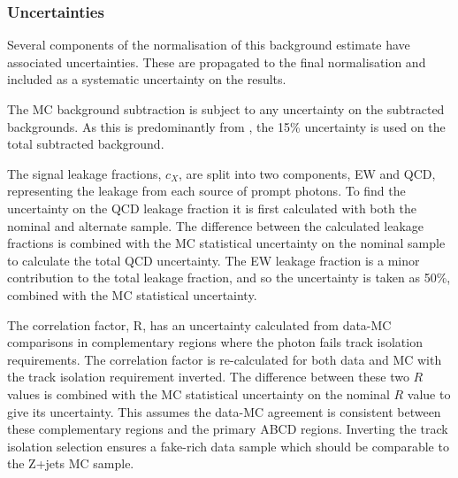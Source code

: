 \subsubsection{Uncertainties}
\label{sec:methods-backgrounds-zjets-uncertainty}

Several components of the normalisation of this background estimate have
associated uncertainties. These are propagated to the final normalisation and
included as a systematic uncertainty on the results.

The \ac{MC} background subtraction is subject to any uncertainty on the
subtracted backgrounds. As this is predominantly from \tty, the 15\% \tty
uncertainty is used on the total subtracted background.

The signal leakage fractions, $c_X$, are split into two components, \ac{EW} and
\ac{QCD}, representing the leakage from each source of prompt photons.  To find
the
uncertainty on the \ac{QCD} leakage fraction it is first calculated with both
the nominal and alternate sample. The difference between the calculated leakage
fractions is combined with the \ac{MC} statistical uncertainty on the nominal
sample to calculate the total \ac{QCD} uncertainty. The \ac{EW} leakage fraction is a
minor contribution to the total leakage fraction, and so the uncertainty is
taken as 50\%, combined with the \ac{MC} statistical uncertainty.

The correlation factor, R, has an uncertainty calculated from data-\ac{MC}
comparisons in complementary regions where the photon fails track isolation
requirements.
The correlation factor is re-calculated for both data and \ac{MC}
with the track isolation requirement inverted. The difference between these two
$R$ values is combined with the \ac{MC} statistical uncertainty on the nominal
$R$ value to give its uncertainty.
This assumes the data-\ac{MC} agreement is consistent between these
complementary regions and the primary ABCD regions. Inverting the track
isolation selection ensures a fake-rich data sample which should be comparable
to the Z+jets \ac{MC} sample.

